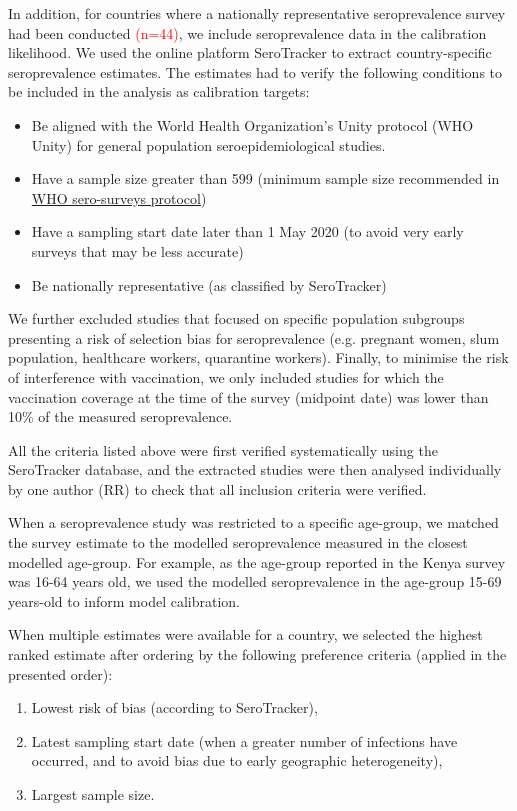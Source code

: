 
In addition, for countries where a nationally representative seroprevalence survey had been conducted \textcolor{red}{(n=44)}, we include
seroprevalence data in the calibration likelihood. We used the online platform SeroTracker to extract country-specific seroprevalence estimates. 
The estimates had to verify the following conditions to be included in the analysis as calibration targets:
\begin{itemize}
    \item Be aligned with the World Health Organization's Unity protocol (WHO Unity) for general population seroepidemiological studies.
    \item Have a sample size greater than 599 (minimum sample size recommended in \textcolor{blue}{\href{https://docs.google.com/document/d/1NYpszkr-u__aZspFDFa_fa4VBzjAAAAxNxM1rZ1txWU/edit}{WHO sero-surveys protocol}})
    \item Have a sampling start date later than 1 May 2020 (to avoid very early surveys that may be less accurate)
    \item Be nationally representative (as classified by SeroTracker)
\end{itemize}

We further excluded studies that focused on specific population subgroups presenting a risk of selection bias for seroprevalence (e.g. pregnant women, slum population, healthcare workers, quarantine workers). 
Finally, to minimise the risk of interference with vaccination, we only included studies for which the vaccination coverage at the time of the survey (midpoint date) 
was lower than 10\% of the measured seroprevalence.

All the criteria listed above were first verified systematically using the SeroTracker database, and the extracted studies were then analysed individually by one author (RR) to check 
that all inclusion criteria were verified.

When a seroprevalence study was restricted to a specific age-group, we matched the survey estimate to the modelled seroprevalence measured in the 
closest modelled age-group. For example, as the age-group reported in the Kenya survey was 16-64 years old, we used the modelled seroprevalence 
in the age-group 15-69 years-old to inform model calibration. 

When multiple estimates were available for a country, we selected the highest ranked estimate after ordering by the following preference criteria (applied in the presented order):
\begin{enumerate}
    \item Lowest risk of bias (according to SeroTracker),
    \item Latest sampling start date (when a greater number of infections have occurred, and to avoid bias due to early geographic heterogeneity),
    \item Largest sample size.
\end{enumerate}

